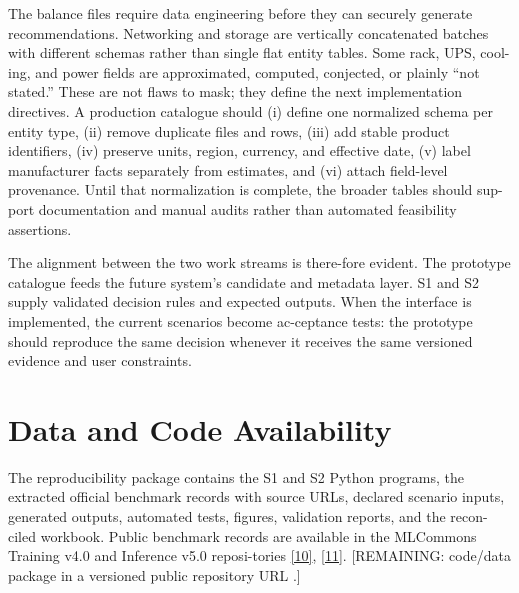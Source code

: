\documentclass[final,3p,12pt,nopreprintline]{elsarticle}
\begin{document}
The balance files require data engineering before they can securely generate recommendations. Networking and storage are vertically concatenated batches with different schemas rather than single flat entity tables. Some rack, UPS, cool-ing, and power fields are approximated, computed, conjected, or plainly “not stated.” These are not flaws to mask; they define the next implementation directives. A production catalogue should (i) define one normalized schema per entity type, (ii) remove duplicate files and rows, (iii) add stable product identifiers, (iv) preserve units, region, currency, and effective date, (v) label manufacturer facts separately from estimates, and (vi) attach field-level provenance. Until that normalization is complete, the broader tables should sup-port documentation and manual audits rather than automated feasibility assertions.


The alignment between the two work streams is there-fore evident. The prototype catalogue feeds the future system’s candidate and metadata layer. S1 and S2 supply validated decision rules and expected outputs. When the interface is implemented, the current scenarios become ac-ceptance tests: the prototype should reproduce the same decision whenever it receives the same versioned evidence and user constraints.


\section*{Data and Code Availability}


The reproducibility package contains the S1 and S2 Python programs, the extracted official benchmark records with source URLs, declared scenario inputs, generated outputs, automated tests, figures, validation reports, and the recon-ciled workbook. Public benchmark records are available in the MLCommons Training v4.0 and Inference v5.0 reposi-tories \hyperref[ref:10]{[10]}, \hyperref[ref:11]{[11]}. [REMAINING: code/data package in a versioned public repository URL .]
\end{document}
